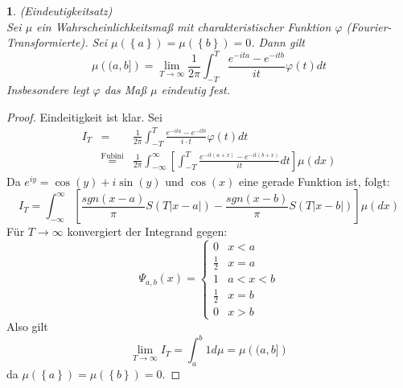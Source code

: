 \documentclass[10pt,a4paper]{report}
\numberwithin{equation}{section}
\numberwithin{figure}{section}
\theoremstyle{plain}
\theoremstyle{definition}
\theoremstyle{plain}
\newtheorem{prop}{\protect\propositionname}[section]
\theoremstyle{definition}
\theoremstyle{remark}
\theoremstyle{plain}
\theoremstyle{plain}
\theoremstyle{plain}
\theoremstyle{plain}
\theoremstyle{plain}
\providecommand{\propositionname}{Satz}
\newcommand{\1}{ \mathbb{1} } %
\begin{document}
\begin{prop} (Eindeutigkeitsatz)\\
Sei $\mu$ ein Wahrscheinlichkeitsmaß mit charakteristischer Funktion
$\varphi$ (Fourier-Transformierte). Sei $\mu\left(\left\{ a\right\} \right)=\mu\left(\left\{ b\right\} \right)=0$.
Dann gilt
\[
\mu\left((a,b]\right)=\lim_{T\to\infty}\frac{1}{2\pi}\int_{-T}^{T}\frac{e^{-ita}-e^{-itb}}{it}\varphi\left(t\right)dt
\]
Insbesondere legt $\varphi$ das Maß $\mu$ eindeutig fest. \end{prop}
\begin{proof}
Eindeitigkeit ist klar. Sei 
\begin{eqnarray*}
I_{T} & = & \frac{1}{2\pi}\int_{-T}^{T}\frac{e^{-ita}-e^{-itb}}{i\cdot t}\varphi(t)dt\\
 & \overset{\mbox{Fubini}}{=} & \frac{1}{2\pi}\int_{-\infty}^{\infty}\left[\int_{-T}^{T}\frac{e^{-it\left(a+x\right)}-e^{-it\left(b+x\right)}}{it}dt\right]\mu\left(dx\right)
\end{eqnarray*}
Da $e^{iy}=\cos\left(y\right)+i\sin\left(y\right)$ und $\cos\left(x\right)$
eine gerade Funktion ist, folgt: 
\[
I_{T}=\int_{-\infty}^{\infty}\left[\frac{sgn\left(x-a\right)}{\pi}S\left(T\left|x-a\right|\right)-\frac{sgn\left(x-b\right)}{\pi}S\left(T\left|x-b\right|\right)\right]\mu\left(dx\right)
\]
Für $T\to\infty$ konvergiert der Integrand gegen: 
\[
\Psi_{a,b}\left(x\right)=\begin{cases}
0 & x<a\\
\frac{1}{2} & x=a\\
1 & a<x<b\\
\frac{1}{2} & x=b\\
0 & x>b
\end{cases}
\]
Also gilt 
\[
\lim_{T\to\infty}I_{T}=\int_{a}^{b}1d\mu=\mu\left((a,b]\right)
\]
da $\mu\left(\left\{ a\right\} \right)=\mu\left(\left\{ b\right\} \right)=0$. 
\end{proof}


\printindex
\end{document}
